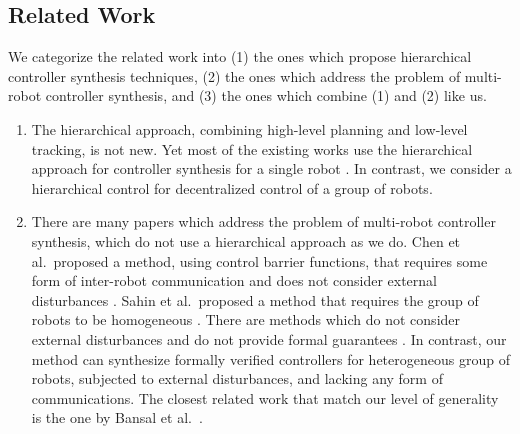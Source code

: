 \subsection{Related Work}

We categorize the related work into (1) the ones which propose hierarchical controller synthesis techniques, (2) the ones which address the problem of multi-robot controller synthesis, and (3) the ones which combine (1) and (2) like us.

\begin{enumerate}[(1)]
	\item The hierarchical approach, combining high-level planning and low-level tracking, is not new.
	Yet most of the existing works use the hierarchical approach for controller synthesis for a single robot \cite{herbert2017fastrack, fan2020fast, fan2018controller, wongpiromsarn2012receding, tedrake2010lqr, singh2018robust, DBLP:journals/tac/MeyerD19, DBLP:journals/corr/abs-1911-09773, Yang2017milp}.
	In contrast, we consider a hierarchical control for decentralized control of a group of robots.
	\item There are many papers which address the problem of multi-robot controller synthesis, which do not use a hierarchical approach as we do.
	Chen et al.\ proposed a method, using control barrier functions, that requires some form of inter-robot communication and does not consider external disturbances \cite{Chen2018cbf}.
	Sahin et al.\ proposed a method that requires the group of robots to be homogeneous \cite{Shahin2017cltl}.
	There are methods which do not consider external disturbances and do not provide formal guarantees \cite{jackson2020scalable}.
	In contrast, our method can synthesize formally verified controllers for heterogeneous group of robots, subjected to external disturbances, and lacking any form of communications.
	The closest related work that match our level of generality is the one by Bansal et al.\ \cite{bansal2017safe}.

\end{enumerate}
